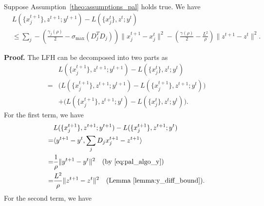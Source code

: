 \begin{lemma}\label{lemma:L_iter_diff}
Suppose Assumption~\ref{theo:assumptions_pal} holds true. We have
\begin{align}
    & L(\{x_j^{t+1}\},z^{t+1};y^{t+1}) - L(\{x_j^{t}\},z^{t};y^{t})\nonumber\\
    & \le \sum_j -\left(\frac{\gamma_j(\rho)}{2}-\sigma_{\text{max}}(D_j^T D_j)\right)\|x_j^{t+1} - x_j^t\|^2 - \left(\frac{\gamma(\rho)}{2} - \frac{L^2}{\rho}\right)\|z^{t+1} - z^t\|^2. \nonumber
\end{align}
\end{lemma}
{\bf Proof.} The LFH can be decomposed into two parts as
\begin{align}
    & L(\{x_j^{t+1}\},z^{t+1};y^{t+1}) - L(\{x_j^{t}\},z^{t};y^{t})\nonumber\\
    = & \big(L(\{x_j^{t+1}\},z^{t+1};y^{t+1}) - L(\{x_j^{t+1}\},z^{t+1};y^{t})\big)\nonumber\\
    & + \big(L(\{x_j^{t+1}\},z^{t+1};y^{t}) - L(\{x_j^{t}\},z^{t};y^{t})\big). \label{eq:proof_diff_L_0_pal}
\end{align}
For the first term, we have
\begin{align}
    & L(\{x_j^{t+1}\},z^{t+1};y^{t+1}) - L(\{x_j^{t+1}\},z^{t+1};y^{t})\nonumber\\
    = & \langle y^{t+1} - y^t , \sum_jD_jx_j^{t+1} - z^{t+1}\rangle\nonumber\\
    = & \frac{1}{\rho}\|y^{t+1} - y^t\|^2\quad\text{(by \eqref{eq:pal_algo_y})}\nonumber\\
    = & \frac{L^2}{\rho}\|z^{t+1} - z^t\|^2\quad\text{(Lemma~\ref{lemma:y_diff_bound})}\label{eq:proof_diff_L_1_pal}.
\end{align}
For the second term, we have
